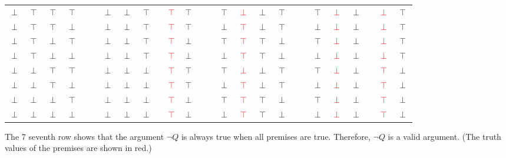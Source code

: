 \documentclass[12pt]{article}
\begin{document}
\begin{tabular}{ c  c  c  c | c  c  c  c  c  c  c  c  c | c  c  c  c  c  c | c  c  c  c  c | c  c }
		$\perp$ & $\top$ & $\top$ & $\top$ &  &  & $\perp$ & $\perp$ & $\top$ &  & \textcolor{red}{$\top$} & $\top$ &  &  & $\top$ & \textcolor{red}{$\perp$} & $\perp$ & $\top$ &  &  & $\top$ & \textcolor{red}{$\perp$} & $\perp$ &  & \textcolor{red}{$\perp$} & $\top$\\
		$\perp$ & $\top$ & $\top$ & $\perp$ &  &  & $\perp$ & $\perp$ & $\top$ &  & \textcolor{red}{$\top$} & $\top$ &  &  & $\perp$ & \textcolor{red}{$\top$} & $\perp$ & $\top$ &  &  & $\perp$ & \textcolor{red}{$\perp$} & $\perp$ &  & \textcolor{red}{$\perp$} & $\top$\\
		$\perp$ & $\top$ & $\perp$ & $\top$ &  &  & $\perp$ & $\perp$ & $\top$ &  & \textcolor{red}{$\top$} & $\perp$ &  &  & $\top$ & \textcolor{red}{$\top$} & $\top$ & $\perp$ &  &  & $\top$ & \textcolor{red}{$\perp$} & $\perp$ &  & \textcolor{red}{$\perp$} & $\top$\\
		$\perp$ & $\top$ & $\perp$ & $\perp$ &  &  & $\perp$ & $\perp$ & $\top$ &  & \textcolor{red}{$\top$} & $\perp$ &  &  & $\perp$ & \textcolor{red}{$\top$} & $\top$ & $\perp$ &  &  & $\perp$ & \textcolor{red}{$\perp$} & $\perp$ &  & \textcolor{red}{$\perp$} & $\top$\\
		$\perp$ & $\perp$ & $\top$ & $\top$ &  &  & $\perp$ & $\perp$ & $\perp$ &  & \textcolor{red}{$\top$} & $\top$ &  &  & $\top$ & \textcolor{red}{$\perp$} & $\perp$ & $\top$ &  &  & $\top$ & \textcolor{red}{$\perp$} & $\perp$ &  & \textcolor{red}{$\top$} & $\perp$\\
		$\perp$ & $\perp$ & $\top$ & $\perp$ &  &  & $\perp$ & $\perp$ & $\perp$ &  & \textcolor{red}{$\top$} & $\top$ &  &  & $\perp$ & \textcolor{red}{$\top$} & $\perp$ & $\top$ &  &  & $\perp$ & \textcolor{red}{$\perp$} & $\perp$ &  & \textcolor{red}{$\top$} & $\perp$\\
		$\perp$ & $\perp$ & $\perp$ & $\top$ &  &  & $\perp$ & $\perp$ & $\perp$ &  & \textcolor{red}{$\top$} & $\perp$ &  &  & $\top$ & \textcolor{red}{$\top$} & $\top$ & $\perp$ &  &  & $\top$ & \textcolor{red}{$\perp$} & $\perp$ &  & \textcolor{red}{$\top$} & $\perp$\\
		$\perp$ & $\perp$ & $\perp$ & $\perp$ &  &  & $\perp$ & $\perp$ & $\perp$ &  & \textcolor{red}{$\top$} & $\perp$ &  &  & $\perp$ & \textcolor{red}{$\top$} & $\top$ & $\perp$ &  &  & $\perp$ & \textcolor{red}{$\perp$} & $\perp$ &  & \textcolor{red}{$\top$} & $\perp$\\
	\end{tabular}
	
	The 7 seventh row shows that the argument $\lnot Q$ is always true when all premises are true. Therefore, $\lnot Q$ is a valid argument. (The truth values of the premises are shown in red.)
	
\end{document}
